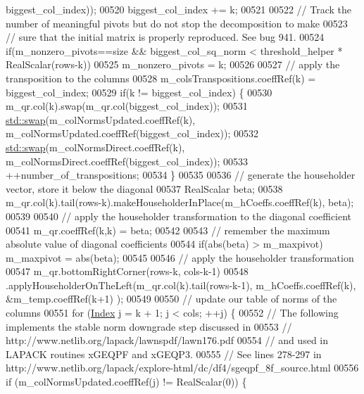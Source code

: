 \begin{DoxyCode}
      biggest\_col\_index));
00520     biggest\_col\_index += k;
00521 
00522     \textcolor{comment}{// Track the number of meaningful pivots but do not stop the decomposition to make}
00523     \textcolor{comment}{// sure that the initial matrix is properly reproduced. See bug 941.}
00524     \textcolor{keywordflow}{if}(m\_nonzero\_pivots==size && biggest\_col\_sq\_norm < threshold\_helper * RealScalar(rows-k))
00525       m\_nonzero\_pivots = k;
00526 
00527     \textcolor{comment}{// apply the transposition to the columns}
00528     m\_colsTranspositions.coeffRef(k) = biggest\_col\_index;
00529     \textcolor{keywordflow}{if}(k != biggest\_col\_index) \{
00530       m\_qr.col(k).swap(m\_qr.col(biggest\_col\_index));
00531       \hyperlink{endian_8c_a3ca5ecd34b04d6a243c054ac3a57f68d}{std::swap}(m\_colNormsUpdated.coeffRef(k), m\_colNormsUpdated.coeffRef(biggest\_col\_index));
00532       \hyperlink{endian_8c_a3ca5ecd34b04d6a243c054ac3a57f68d}{std::swap}(m\_colNormsDirect.coeffRef(k), m\_colNormsDirect.coeffRef(biggest\_col\_index));
00533       ++number\_of\_transpositions;
00534     \}
00535 
00536     \textcolor{comment}{// generate the householder vector, store it below the diagonal}
00537     RealScalar beta;
00538     m\_qr.col(k).tail(rows-k).makeHouseholderInPlace(m\_hCoeffs.coeffRef(k), beta);
00539 
00540     \textcolor{comment}{// apply the householder transformation to the diagonal coefficient}
00541     m\_qr.coeffRef(k,k) = beta;
00542 
00543     \textcolor{comment}{// remember the maximum absolute value of diagonal coefficients}
00544     \textcolor{keywordflow}{if}(abs(beta) > m\_maxpivot) m\_maxpivot = abs(beta);
00545 
00546     \textcolor{comment}{// apply the householder transformation}
00547     m\_qr.bottomRightCorner(rows-k, cols-k-1)
00548         .applyHouseholderOnTheLeft(m\_qr.col(k).tail(rows-k-1), m\_hCoeffs.coeffRef(k), &m\_temp.coeffRef(k+1)
      );
00549 
00550     \textcolor{comment}{// update our table of norms of the columns}
00551     \textcolor{keywordflow}{for} (\hyperlink{namespace_eigen_a62e77e0933482dafde8fe197d9a2cfde}{Index} j = k + 1; j < cols; ++j) \{
00552       \textcolor{comment}{// The following implements the stable norm downgrade step discussed in}
00553       \textcolor{comment}{// http://www.netlib.org/lapack/lawnspdf/lawn176.pdf}
00554       \textcolor{comment}{// and used in LAPACK routines xGEQPF and xGEQP3.}
00555       \textcolor{comment}{// See lines 278-297 in http://www.netlib.org/lapack/explore-html/dc/df4/sgeqpf\_8f\_source.html}
00556       \textcolor{keywordflow}{if} (m\_colNormsUpdated.coeffRef(j) != RealScalar(0)) \{

\end{DoxyCode}
